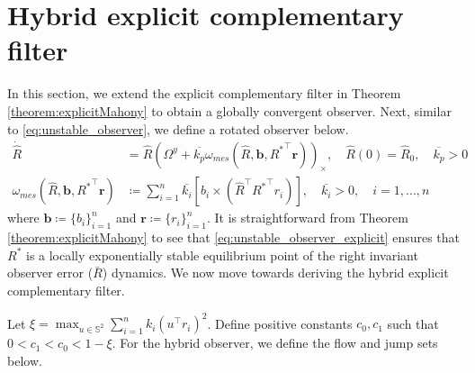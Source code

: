 \documentclass{article}
\newcommand{\SOthree}{\mathbb{SO}(3)}
\newcommand{\R}[1]{\mathbb{R}^{#1}}
\newcommand{\Omegay}{\Omega^y}
\newcommand{\brackets}[1]{\left(#1\right)}
\newcommand{\Rstar}{{R^*}}
\begin{document}
\section{Hybrid explicit complementary filter}
In this section, we extend the explicit complementary filter in Theorem \ref{theorem:explicitMahony} to obtain a globally convergent observer. Next, similar to \eqref{eq:unstable_observer}, we define a rotated observer below. 
\begin{subequations}\label{eq:unstable_observer_explicit}
\begin{align}
    \dot{\hat{R}} &= \hat{R}\brackets{\Omegay + \overline{k_p}\omega_{mes}(\hat{R}, \mathbf{b}, {R^{*}}^\top \mathbf{r})}_\times,\quad \hat{R}(0) = \hat{R}_0, \quad\overline{k_p}>0\\
    \omega_{mes}(\hat{R}, \mathbf{b}, {\Rstar}^\top \mathbf{r})&\coloneqq \sum_{i=1}^n \overline{k_i} \left[b_i\times (\hat{R}^\top {R^*}^\top r_i)\right],\quad \overline{k_i}> 0, \quad i=1,..., n
\end{align}
\end{subequations}
where $\mathbf{b}\coloneqq \{b_i\}_{i=1}^n$ and $\mathbf{r}\coloneqq \{r_i\}_{i=1}^n$. It is straightforward from Theorem \ref{theorem:explicitMahony} to see that \eqref{eq:unstable_observer_explicit} ensures that $R^*$ is a locally exponentially stable equilibrium point of the right invariant observer error ($\bar{R}$) dynamics. We now move towards deriving the hybrid explicit complementary filter.  


Let $\xi = \max_{u\in\mathbb{S}^2} \sum_{i=1}^nk_i (u^\top r_i)^2$. Define positive constants $c_0, c_1$ such that $0 < c_1 < c_0 < 1-\xi$. For the hybrid observer, we define the flow and jump sets below. 

\end{document}
